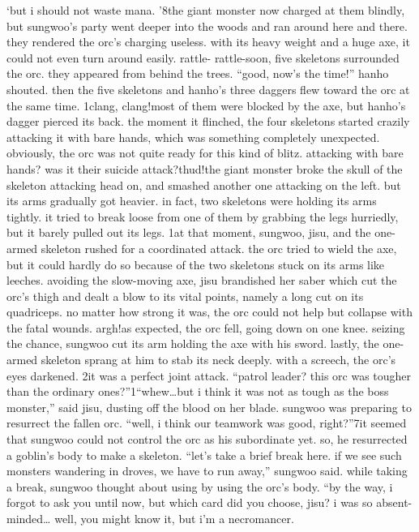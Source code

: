 ‘but i should not waste mana.
’8the giant monster now charged at them blindly, but sungwoo’s party went deeper into the woods and ran around here and there.
 they rendered the orc’s charging useless.
 with its heavy weight and a huge axe, it could not even turn around easily.
rattle- rattle-soon, five skeletons surrounded the orc.
 they appeared from behind the trees.
“good, now’s the time!” hanho shouted.
 then the five skeletons and hanho’s three daggers flew toward the orc at the same time.
1clang, clang!most of them were blocked by the axe, but hanho’s dagger pierced its back.
 the moment it flinched, the four skeletons started crazily attacking it with bare hands, which was something completely unexpected.
obviously, the orc was not quite ready for this kind of blitz.
 attacking with bare hands? was it their suicide attack?thud!the giant monster broke the skull of the skeleton attacking head on, and smashed another one attacking on the left.
 but its arms gradually got heavier.
in fact, two skeletons were holding its arms tightly.
 it tried to break loose from one of them by grabbing the legs hurriedly, but it barely pulled out its legs.
1at that moment, sungwoo, jisu, and the one-armed skeleton rushed for a coordinated attack.
 the orc tried to wield the axe, but it could hardly do so because of the two skeletons stuck on its arms like leeches.
avoiding the slow-moving axe, jisu brandished her saber which cut the orc’s thigh and dealt a blow to its vital points, namely a long cut on its quadriceps.
 no matter how strong it was, the orc could not help but collapse with the fatal wounds.
argh!as expected, the orc fell, going down on one knee.
 seizing the chance, sungwoo cut its arm holding the axe with his sword.
 lastly, the one-armed skeleton sprang at him to stab its neck deeply.
with a screech, the orc’s eyes darkened.
2it was a perfect joint attack.
“patrol leader? this orc was tougher than the ordinary ones?”1“whew…but i think it was not as tough as the boss monster,” said jisu, dusting off the blood on her blade.
 sungwoo was preparing to resurrect the fallen orc.
“well, i think our teamwork was good, right?”7it seemed that sungwoo could not control the orc as his subordinate yet.
 so, he resurrected a goblin’s body to make a skeleton.
“let’s take a brief break here.
 if we see such monsters wandering in droves, we have to run away,” sungwoo said.
while taking a break, sungwoo thought about using  by using the orc’s body.
“by the way, i forgot to ask you until now, but which card did you choose, jisu? i was so absent-minded… well, you might know it, but i’m a necromancer.
